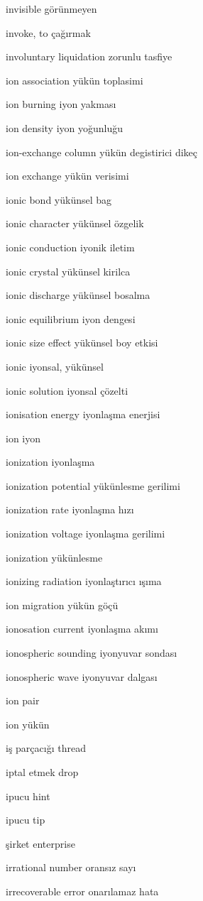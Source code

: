 \documentclass[12pt,fleqn]{article}\usepackage{../../common}
\begin{document}
invisible görünmeyen

invoke, to çağırmak

involuntary liquidation zorunlu tasfiye

ion association yükün toplasimi

ion burning iyon yakması

ion density iyon yoğunluğu

ion-exchange column yükün degistirici dikeç

ion exchange yükün verisimi

ionic bond yükünsel bag

ionic character yükünsel özgelik

ionic conduction iyonik iletim

ionic crystal yükünsel kirilca

ionic discharge yükünsel bosalma

ionic equilibrium iyon dengesi

ionic size effect yükünsel boy etkisi

ionic iyonsal, yükünsel

ionic solution iyonsal çözelti

ionisation energy iyonlaşma enerjisi

ion iyon

ionization iyonlaşma

ionization potential yükünlesme gerilimi

ionization rate iyonlaşma hızı

ionization voltage iyonlaşma gerilimi

ionization yükünlesme

ionizing radiation iyonlaştırıcı ışıma

ion migration yükün göçü

ionosation current iyonlaşma akımı

ionospheric sounding iyonyuvar sondası

ionospheric wave iyonyuvar dalgası

ion pair

ion yükün

iş parçacığı thread

iptal etmek drop

ipucu hint

ipucu tip

şirket enterprise

irrational number oransız sayı

irrecoverable error onarılamaz hata
\end{document}
